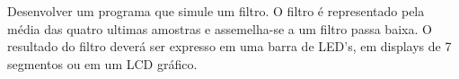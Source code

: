 %
%
%
Desenvolver um programa que simule um filtro. O filtro é representado pela média das quatro ultimas amostras e assemelha-se a um filtro passa baixa. O resultado do filtro deverá ser expresso em uma barra de LED's, em displays de 7 segmentos ou em um LCD gráfico.
%

